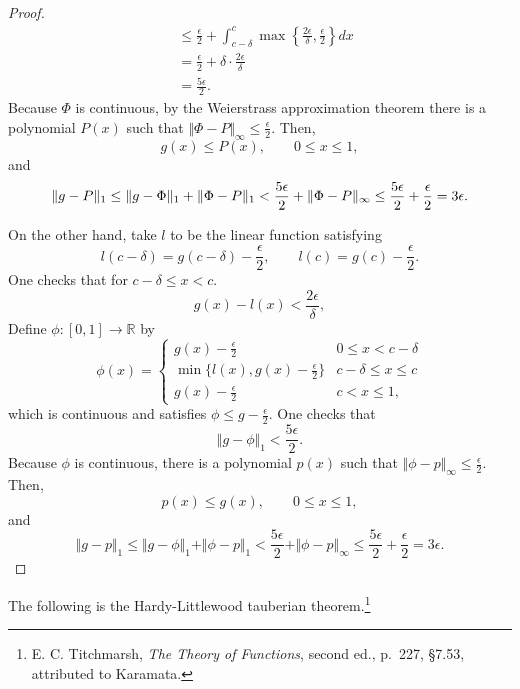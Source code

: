 \documentclass{article}
\newcommand{\norm}[1]{\Vert #1 \Vert}
\begin{document}
\begin{proof}
\begin{align*}
&\leq  \frac{\epsilon}{2}+\int_{c-\delta}^c \max\left\{\frac{2\epsilon}{\delta},\frac{\epsilon}{2}\right\} dx\\
&= \frac{\epsilon}{2}+\delta \cdot \frac{2\epsilon}{\delta}\\
&=\frac{5\epsilon}{2}.
\end{align*}
Because $\Phi$ is continuous, by the Weierstrass approximation theorem there is a polynomial $P(x)$
such that $\norm{\Phi-P}_\infty \leq \frac{\epsilon}{2}$. Then,
\[
g(x) \leq P(x), \qquad 0 \leq x \leq 1,
\]
and
\[
\norm{g-P}_1 \leq \norm{g-\Phi}_1 + \norm{\Phi-P}_1
< \frac{5\epsilon}{2}+\norm{\Phi-P}_\infty\\
\leq \frac{5\epsilon}{2}+\frac{\epsilon}{2}
=3\epsilon.
\]

On the other hand, take $l$ to be the linear function satisfying
\[
l(c-\delta)=g(c-\delta) - \frac{\epsilon}{2}, \qquad l(c)=g(c)-\frac{\epsilon}{2}.
\]
One checks that for $c-\delta \leq x < c$.
\[
g(x)-l(x) < \frac{2\epsilon}{\delta},
\] 
Define $\phi:[0,1] \to \mathbb{R}$ by
\[
\phi(x)=\begin{cases}
g(x)-\frac{\epsilon}{2}&0 \leq x < c-\delta\\
\min\{l(x),g(x)-\frac{\epsilon}{2}\}&c-\delta \leq x \leq c\\
g(x)-\frac{\epsilon}{2}&c<x\leq 1,
\end{cases}
\]
which is continuous and satisfies $\phi \leq g-\frac{\epsilon}{2}$.
One checks that
\[
\norm{g-\phi}_1  < \frac{5\epsilon}{2}.
\]
Because $\phi$ is continuous, there is a polynomial $p(x)$ such that
$\norm{\phi-p}_\infty \leq \frac{\epsilon}{2}$. Then,
\[
p(x) \leq g(x), \qquad 0 \leq x \leq 1,
\]
and
\[
\norm{g-p}_1 \leq \norm{g-\phi}_1 + \norm{\phi-p}_1
<\frac{5\epsilon}{2}+\norm{\phi-p}_\infty
\leq \frac{5\epsilon}{2}+\frac{\epsilon}{2}
=3\epsilon. 
\]
\end{proof}


The following is the Hardy-Littlewood tauberian theorem.\footnote{E. C. Titchmarsh, {\em The Theory of Functions}, second ed., p.~227, \S 7.53, attributed to Karamata.}
\end{document}
